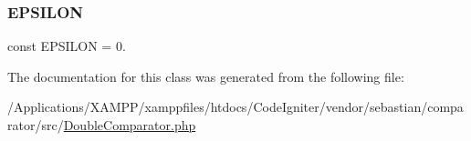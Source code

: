 \subsubsection{\texorpdfstring{E\+P\+S\+I\+L\+ON}{EPSILON}}
{\footnotesize\ttfamily const E\+P\+S\+I\+L\+ON = 0.}



The documentation for this class was generated from the following file\+:\begin{DoxyCompactItemize}
\item 
/\+Applications/\+X\+A\+M\+P\+P/xamppfiles/htdocs/\+Code\+Igniter/vendor/sebastian/comparator/src/\mbox{\hyperlink{_double_comparator_8php}{Double\+Comparator.\+php}}\end{DoxyCompactItemize}
